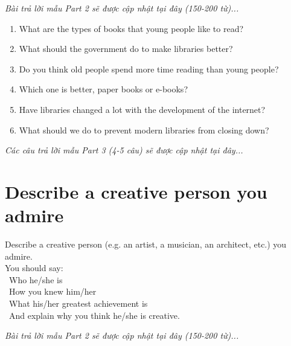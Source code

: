 \vspace{1em}
\textit{Bài trả lời mẫu Part 2 sẽ được cập nhật tại đây (150-200 từ)...}
\vspace{2em}

\begin{ieltsprompt}
\begin{enumerate}[itemsep=4pt]
    \item What are the types of books that young people like to read?
    \item What should the government do to make libraries better?
    \item Do you think old people spend more time reading than young people?
    \item Which one is better, paper books or e-books?
    \item Have libraries changed a lot with the development of the internet?
    \item What should we do to prevent modern libraries from closing down?
\end{enumerate}
\end{ieltsprompt}

\vspace{1em}
\textit{Các câu trả lời mẫu Part 3 (4-5 câu) sẽ được cập nhật tại đây...}
\vspace{2em}

\section{Describe a creative person you admire}
\begin{ieltsprompt}
Describe a creative person (e.g. an artist, a musician, an architect, etc.) you admire. \\
You should say: \\
\textbullet\ Who he/she is \\
\textbullet\ How you knew him/her \\
\textbullet\ What his/her greatest achievement is \\
\textbullet\ And explain why you think he/she is creative. \\
\end{ieltsprompt}

\vspace{1em}
\textit{Bài trả lời mẫu Part 2 sẽ được cập nhật tại đây (150-200 từ)...}
\vspace{2em}

